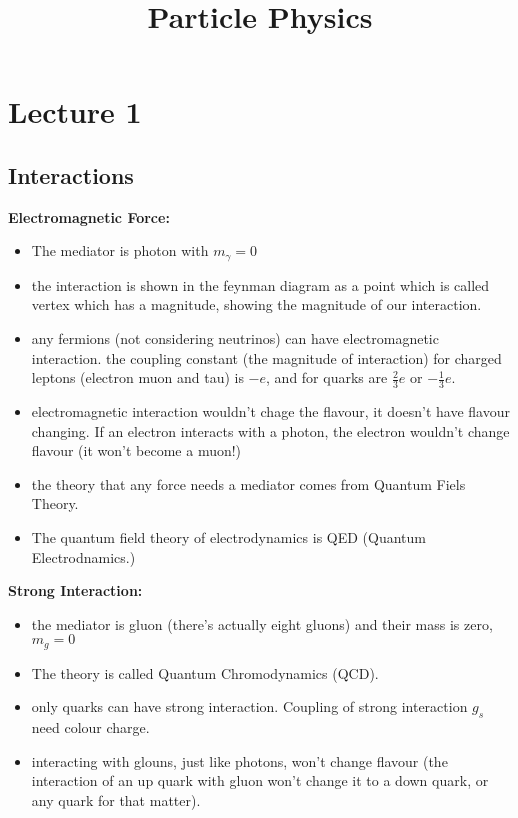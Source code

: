 \documentclass[10pt,a4paper]{article}
\title{Particle Physics}
\newcounter{theo}
\begin{document}
          \maketitle
          \tableofcontents

          \section{Lecture 1}
          \subsection{Interactions}
          \textbf{Electromagnetic Force:}
          \begin{itemize}
               \item  The mediator is photon with $m_\gamma =0$ 
               \item the interaction is shown in the feynman diagram as a point which is called vertex which has a magnitude, showing the magnitude of our interaction.
               \item any fermions (not considering neutrinos) can have electromagnetic interaction. the coupling constant (the magnitude of interaction) for charged leptons (electron muon and tau) is $-e$, and for quarks are $\frac23 e$ or $-\frac13 e$.
               \item electromagnetic interaction wouldn't chage the flavour, it doesn't have flavour changing. If an electron interacts with a photon, the electron wouldn't change flavour (it won't become a muon!)
               \item the theory that any force needs a mediator comes from Quantum Fiels Theory.
               \item The quantum field theory of electrodynamics is QED (Quantum Electrodnamics.)
          \end{itemize}
          \textbf{Strong Interaction:}
          \begin{itemize}
               \item the mediator is gluon (there's actually eight gluons) and their mass is zero, $m_g=0$ 
               \item The theory is called Quantum Chromodynamics (QCD).
               \item only quarks can have strong interaction. Coupling of strong interaction $g_s$ need colour charge.
               \item interacting with glouns, just like photons, won't change flavour (the interaction of an up quark with gluon won't change it to a down quark, or any quark for that matter).
          \end{itemize}
\end{document}

